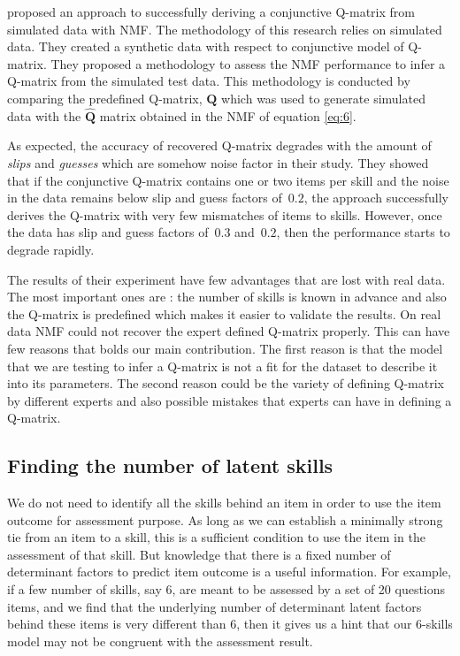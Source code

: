 \citet{desmarais2012mapping} proposed an approach to successfully deriving a conjunctive Q-matrix from simulated data with NMF. The methodology of this research relies on simulated data. They created a synthetic data with respect to conjunctive model of Q-matrix. They proposed a methodology to assess the NMF performance to infer a Q-matrix from the simulated test data. This methodology is conducted by comparing the predefined Q-matrix, $\mathbf{Q}$ which was used to generate simulated data with the $\hat{\mathbf{Q}}$ matrix obtained in the NMF of equation \ref{eq:6}.

As expected, the accuracy of recovered Q-matrix degrades with the amount of \textit{slips} and \textit{guesses} which are somehow noise factor in their study. They showed that if the conjunctive Q-matrix contains one or two items per skill and the noise in the data remains below slip and guess factors of~$0.2$, the approach successfully derives the Q-matrix with very few mismatches of items to skills. However, once the data has slip and guess factors of~$0.3$ and~$0.2$, then the performance starts to degrade rapidly.

The results of their experiment have few advantages that are lost with real data. The most important ones are : the number of skills is known in advance and also the Q-matrix is predefined which makes it easier to validate the results. On real data NMF could not recover the expert defined Q-matrix properly. This can have few reasons that bolds our main contribution. The first reason is that the model that we are testing to infer a Q-matrix is not a fit for the dataset to describe it into its parameters. The second reason could be the variety of defining Q-matrix by different experts and also possible mistakes that experts can have in defining a Q-matrix.

\subsection{Finding the number of latent skills}
\label{EDM2012}

We do not need to identify all the skills behind an item in order to use the item outcome for assessment purpose. As long as we can establish a minimally strong tie from an item to a skill, this is a sufficient condition to use the item in the assessment of that skill. But knowledge that there is a fixed number of determinant factors to predict item outcome is a useful information. For example, if a few number of skills, say 6, are meant to be assessed by a set of 20 questions items, and we find that the underlying number of determinant latent factors behind these items is very different than 6, then it gives us a hint that our 6-skills model may not be congruent with the assessment result.

